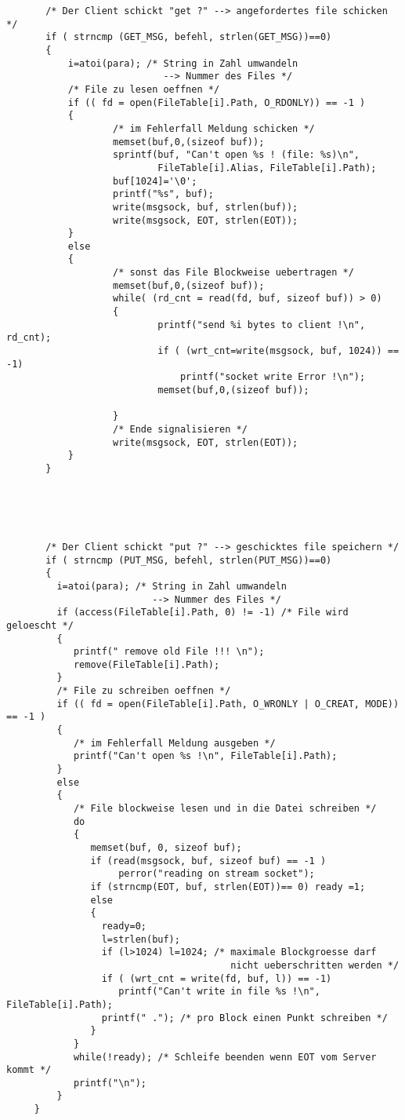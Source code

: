 \begin{verbatim}
       /* Der Client schickt "get ?" --> angefordertes file schicken */
       if ( strncmp (GET_MSG, befehl, strlen(GET_MSG))==0)
       {
           i=atoi(para); /* String in Zahl umwandeln
                            --> Nummer des Files */
           /* File zu lesen oeffnen */
           if (( fd = open(FileTable[i].Path, O_RDONLY)) == -1 )
           {
                   /* im Fehlerfall Meldung schicken */
                   memset(buf,0,(sizeof buf));
                   sprintf(buf, "Can't open %s ! (file: %s)\n",
                           FileTable[i].Alias, FileTable[i].Path);
                   buf[1024]='\0';
                   printf("%s", buf);
                   write(msgsock, buf, strlen(buf));
                   write(msgsock, EOT, strlen(EOT));
           } 
           else 
           { 
                   /* sonst das File Blockweise uebertragen */
                   memset(buf,0,(sizeof buf));
                   while( (rd_cnt = read(fd, buf, sizeof buf)) > 0)
                   {
                           printf("send %i bytes to client !\n", rd_cnt);
                           if ( (wrt_cnt=write(msgsock, buf, 1024)) == -1)
                               printf("socket write Error !\n");
                           memset(buf,0,(sizeof buf));
                    
                   }
                   /* Ende signalisieren */
                   write(msgsock, EOT, strlen(EOT));
           } 
       } 
 




       /* Der Client schickt "put ?" --> geschicktes file speichern */
       if ( strncmp (PUT_MSG, befehl, strlen(PUT_MSG))==0)
       {
         i=atoi(para); /* String in Zahl umwandeln
                          --> Nummer des Files */
         if (access(FileTable[i].Path, 0) != -1) /* File wird geloescht */
         {
            printf(" remove old File !!! \n");
            remove(FileTable[i].Path);
         }
         /* File zu schreiben oeffnen */
         if (( fd = open(FileTable[i].Path, O_WRONLY | O_CREAT, MODE)) == -1 )
         {
            /* im Fehlerfall Meldung ausgeben */
            printf("Can't open %s !\n", FileTable[i].Path);
         }
         else
         {
            /* File blockweise lesen und in die Datei schreiben */
            do
            {
               memset(buf, 0, sizeof buf);
               if (read(msgsock, buf, sizeof buf) == -1 )
                    perror("reading on stream socket");
               if (strncmp(EOT, buf, strlen(EOT))== 0) ready =1;
               else
               {
                 ready=0;
                 l=strlen(buf);
                 if (l>1024) l=1024; /* maximale Blockgroesse darf
                                        nicht ueberschritten werden */
                 if ( (wrt_cnt = write(fd, buf, l)) == -1)
                    printf("Can't write in file %s !\n", FileTable[i].Path);
                 printf(" ."); /* pro Block einen Punkt schreiben */
               }
            }
            while(!ready); /* Schleife beenden wenn EOT vom Server kommt */
            printf("\n");
         }
     }





\end{verbatim}
